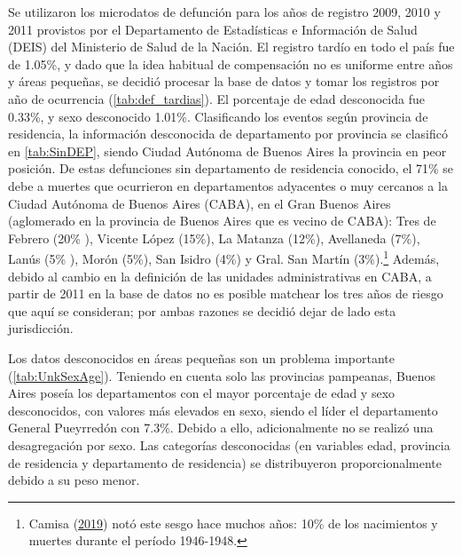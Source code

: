 \documentclass[12pt,]{article}
\begin{document}
Se utilizaron los microdatos de defunción para los años de registro
2009, 2010 y 2011 provistos por el Departamento de Estadísticas e
Información de Salud (DEIS) del Ministerio de Salud de la Nación. El
registro tardío en todo el país fue de 1.05\%, y dado que la idea
habitual de compensación no es uniforme entre años y áreas pequeñas, se
decidió procesar la base de datos y tomar los registros por año de
ocurrencia (\ref{tab:def_tardias}). El porcentaje de edad desconocida
fue 0.33\%, y sexo desconocido 1.01\%. Clasificando los eventos según
provincia de residencia, la información desconocida de departamento por
provincia se clasificó en \ref{tab:SinDEP}, siendo Ciudad Autónoma de
Buenos Aires la provincia en peor posición. De estas defunciones sin
departamento de residencia conocido, el 71\% se debe a muertes que
ocurrieron en departamentos adyacentes o muy cercanos a la Ciudad
Autónoma de Buenos Aires (CABA), en el Gran Buenos Aires (aglomerado en
la provincia de Buenos Aires que es vecino de CABA): Tres de Febrero
(20\% ), Vicente López (15\%), La Matanza (12\%), Avellaneda (7\%),
Lanús (5\% ), Morón (5\%), San Isidro (4\%) y Gral. San Martín
(3\%).\footnote{Camisa (\protect\hyperlink{ref-Camisa_2019}{2019}) notó
  este sesgo hace muchos años: 10\% de los nacimientos y muertes durante
  el período 1946-1948.} Además, debido al cambio en la definición de
las unidades administrativas en CABA, a partir de 2011 en la base de
datos no es posible matchear los tres años de riesgo que aquí se
consideran; por ambas razones se decidió dejar de lado esta
jurisdicción.

Los datos desconocidos en áreas pequeñas son un problema importante
(\ref{tab:UnkSexAge}). Teniendo en cuenta solo las provincias pampeanas,
Buenos Aires poseía los departamentos con el mayor porcentaje de edad y
sexo desconocidos, con valores más elevados en sexo, siendo el líder el
departamento General Pueyrredón con 7.3\%. Debido a ello, adicionalmente
no se realizó una desagregación por sexo. Las categorías desconocidas
(en variables edad, provincia de residencia y departamento de
residencia) se distribuyeron proporcionalmente debido a su peso menor.
\end{document}
